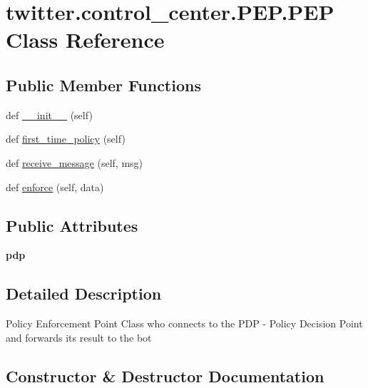 \hypertarget{classtwitter_1_1control__center_1_1PEP_1_1PEP}{}\section{twitter.\+control\+\_\+center.\+P\+E\+P.\+P\+EP Class Reference}
\label{classtwitter_1_1control__center_1_1PEP_1_1PEP}
\subsection*{Public Member Functions}
\begin{DoxyCompactItemize}
\item 
def \hyperlink{classtwitter_1_1control__center_1_1PEP_1_1PEP_a39f16437e59b0aba7094713042e0a6a6}{\+\_\+\+\_\+init\+\_\+\+\_\+} (self)
\item 
def \hyperlink{classtwitter_1_1control__center_1_1PEP_1_1PEP_af13289593fcd0c6d2e945b9431642120}{first\+\_\+time\+\_\+policy} (self)
\item 
def \hyperlink{classtwitter_1_1control__center_1_1PEP_1_1PEP_a77d6cfa9b9fed7164b8c370b7147922f}{receive\+\_\+message} (self, msg)
\item 
def \hyperlink{classtwitter_1_1control__center_1_1PEP_1_1PEP_ad3d661b529e2bd004eda5e3746dab298}{enforce} (self, data)
\end{DoxyCompactItemize}
\subsection*{Public Attributes}
\begin{DoxyCompactItemize}
\item 
\mbox{\label{classtwitter_1_1control__center_1_1PEP_1_1PEP_a240eab8688830086e20637c393743af7}} 
{\bfseries pdp}
\end{DoxyCompactItemize}


\subsection{Detailed Description}
\begin{DoxyVerb}Policy Enforcement Point
Class who connects to the PDP - Policy Decision Point and forwards its result to the bot
\end{DoxyVerb}
 

\subsection{Constructor \& Destructor Documentation}
\mbox{\label{classtwitter_1_1control__center_1_1PEP_1_1PEP_a39f16437e59b0aba7094713042e0a6a6}} 
